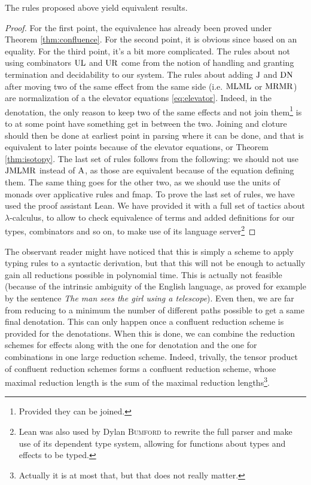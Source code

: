 \begin{thm}
	The rules proposed above yield equivalent results.
\end{thm}
\begin{proof}
	For the first point, the equivalence has already been proved under Theorem
	\ref{thm:confluence}.
	For the second point, it is obvious since based on an equality.
	For the third point, it's a bit more complicated.
	The rules about not using combinators $\text{UL}$ and $\text{UR}$ come from the
	notion of handling and granting termination and decidability to our system.
	The rules about adding $\text{J}$ and $\text{DN}$ after moving two of the same
	effect from the same side (i.e. $\text{ML} \text{ML}$ or $\text{MR}\text{MR}$) are
	normalization of a the elevator equations \ref{eq:elevator}.
	Indeed, in the denotation, the only reason to keep two of the same effects
	and not join them\footnote{Provided they can be joined.} is to at some point
	have something get in between the two.
	Joining and cloture should then be done at earliest point in parsing where it
	can be done, and that is equivalent to later points because of the elevator
	equations, or Theorem \ref{thm:isotopy}.
	The last set of rules follows from the following: we should not use $\text{J}
		\text{ML} \text{MR}$ instead of $\text{A}$, as those are equivalent because of the
	equation defining them.
	The same thing goes for the other two, as we should use the units of monads
	over applicative rules and fmap.
	To prove the last set of rules, we have used the proof assistant Lean.
	We have provided it with a full set of tactics about $\lambda$-calculus,
	to allow to check equivalence of terms and added definitions for our types,
	combinators and so on, to make use of its language server\footnote{Lean was
		also used by Dylan \textsc{Bumford} to rewrite the full parser and make use
		of its dependent type system, allowing for functions about types and
		effects to be typed.}
\end{proof}

\medskip

The observant reader might have noticed that this is simply a scheme to apply
typing rules to a syntactic derivation, but that this will not be enough to
actually gain all reductions possible in polynomial time.
This is actually not feasible (because of the intrinsic ambiguity of the
English language, as proved for example by the sentence \emph{The man sees the
	girl using a telescope}).
Even then, we are far from reducing to a minimum the number of different paths
possible to get a same final denotation.
This can only happen once a confluent reduction scheme is provided for the
denotations.
When this is done, we can combine the reduction schemes for effects along with
the one for denotation and the one for combinations in one large reduction
scheme.
Indeed, trivally, the tensor product of confluent reduction schemes forms a
confluent reduction scheme, whose maximal reduction length is the sum of the
maximal reduction lengths\footnote{Actually it is at most that, but that does
	not	really matter.}.

